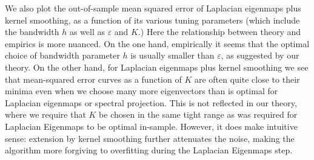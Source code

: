 \documentclass{article}
\newcommand{\1}{\mathbf{1}}
\theoremstyle{alden}
\theoremstyle{aldenthm}
\theoremstyle{definition}
\theoremstyle{remark}
\begin{document}
We also plot the out-of-sample mean squared error of Laplacian eigenmaps plus kernel smoothing, as a function of its various tuning parameters (which include the bandwidth $h$ as well as $\varepsilon$ and $K$.) Here the relationship between theory and empirics is more nuanced. On the one hand, empirically it seems that the optimal choice of bandwidth parameter $h$ is usually smaller than $\varepsilon$, as suggested by our theory. On the other hand, for Laplacian eigenmaps plus kernel smoothing we see that mean-squared error curves as a function of $K$ are often quite close to their minima even when we choose many more eigenvectors than is optimal for Laplacian eigenmaps or spectral projection. This is not reflected in our theory, where we require that $K$ be chosen in the same tight range as was required for Laplacian Eigenmaps to be optimal in-sample. However, it does make intuitive sense: extension by kernel smoothing further attenuates the noise, making the algorithm more forgiving to overfitting during the Laplacian Eigenmaps step. 
\end{document}
